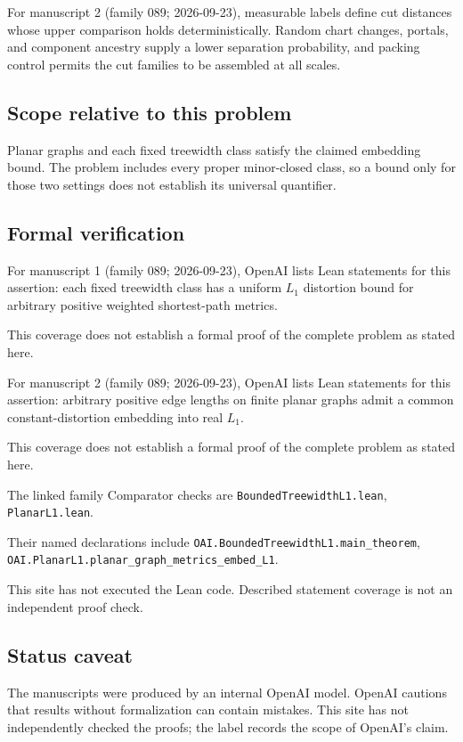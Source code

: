 \documentclass[11pt]{article}
\begin{document}
For manuscript 2 (family 089; 2026-09-23), measurable labels define cut distances whose upper comparison holds deterministically. Random chart changes, portals, and component ancestry supply a lower separation probability, and packing control permits the cut families to be assembled at all scales.

\subsection{Scope relative to this problem}
Planar graphs and each fixed treewidth class satisfy the claimed embedding bound. The problem includes every proper minor-closed class, so a bound only for those two settings does not establish its universal quantifier.

\subsection{Formal verification}
For manuscript 1 (family 089; 2026-09-23), OpenAI lists Lean statements for this assertion: each fixed treewidth class has a uniform $L_1$ distortion bound for arbitrary positive weighted shortest-path metrics.

This coverage does not establish a formal proof of the complete problem as stated here.

For manuscript 2 (family 089; 2026-09-23), OpenAI lists Lean statements for this assertion: arbitrary positive edge lengths on finite planar graphs admit a common constant-distortion embedding into real $L_1$.

This coverage does not establish a formal proof of the complete problem as stated here.

The linked family Comparator checks are \texttt{BoundedTreewidthL1.lean}, \texttt{PlanarL1.lean}.

Their named declarations include \texttt{OAI.BoundedTreewidthL1.main\_theorem}, \texttt{OAI.PlanarL1.planar\_graph\_metrics\_embed\_L1}.

This site has not executed the Lean code. Described statement coverage is not an independent proof check.

\subsection{Status caveat}
The manuscripts were produced by an internal OpenAI model. OpenAI cautions that results without formalization can contain mistakes. This site has not independently checked the proofs; the label records the scope of OpenAI's claim.
\end{document}
